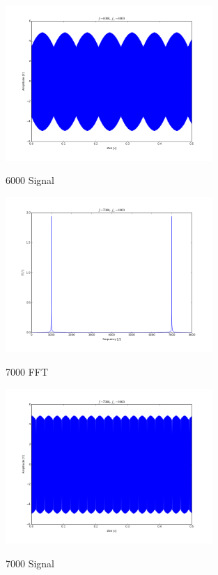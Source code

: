 \documentclass[TGAI_Laborbericht.tex]{subfiles}
\begin{document}
\begin{figure}[H]
	\includegraphics[width=0.7\textwidth]{media/6000-signal.png}
	\label{Hoch}
	\caption{6000 Signal}
\end{figure}

\begin{figure}[H]
	\includegraphics[width=0.7\textwidth]{media/7000-fft.png}
	\label{Hoch}
	\caption{7000 FFT}
\end{figure}

\begin{figure}[H]
	\includegraphics[width=0.7\textwidth]{media/7000-signal.png}
	\label{Hoch}
	\caption{7000 Signal}
\end{figure}
\end{document}
